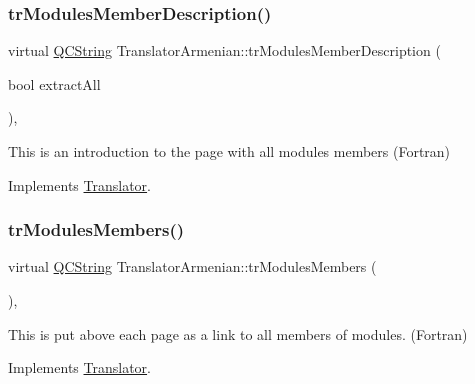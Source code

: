 \mbox{\label{class_translator_armenian_a42ca4f7bfc8c21233a74e3b862eae68c}} 
\subsubsection{\texorpdfstring{trModulesMemberDescription()}{trModulesMemberDescription()}}
{\footnotesize\ttfamily virtual \mbox{\hyperlink{class_q_c_string}{Q\+C\+String}} Translator\+Armenian\+::tr\+Modules\+Member\+Description (\begin{DoxyParamCaption}\item[{bool}]{extract\+All }\end{DoxyParamCaption})\hspace{0.3cm}{\ttfamily [inline]}, {\ttfamily [virtual]}}

This is an introduction to the page with all modules members (Fortran) 

Implements \mbox{\hyperlink{class_translator}{Translator}}.

\mbox{\label{class_translator_armenian_a7df3219d5ebc8273fb3e08d561a07306}} 
\subsubsection{\texorpdfstring{trModulesMembers()}{trModulesMembers()}}
{\footnotesize\ttfamily virtual \mbox{\hyperlink{class_q_c_string}{Q\+C\+String}} Translator\+Armenian\+::tr\+Modules\+Members (\begin{DoxyParamCaption}{ }\end{DoxyParamCaption})\hspace{0.3cm}{\ttfamily [inline]}, {\ttfamily [virtual]}}

This is put above each page as a link to all members of modules. (Fortran) 

Implements \mbox{\hyperlink{class_translator}{Translator}}.

\mbox{\label{class_translator_armenian_a8700c36c8849f3df7edfdcd7d0c58f86}} 
